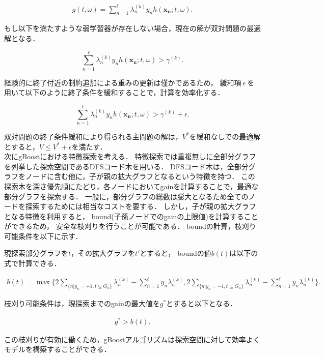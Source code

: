 \begin{align}
	\label{eq:gain}
	g(t, \omega) = \sum_{n=1}^{\ell} \lambda_{n}^{(k)} y_{n} h(\bm{x_{n}} ; t, \omega).
\end{align}

もし以下を満たすような弱学習器が存在しない場合，現在の解が双対問題の最適解となる．

\begin{equation*}
	\sum_{n=1}^{\ell} \lambda_{n}^{(k)} y_{n} h(\bm{x_{n}} ; t, \omega) > \gamma^{(k)}.
\end{equation*}

経験的に終了付近の制約追加による重みの更新は僅かであるため，
緩和項$\ \epsilon \ $を用いて以下のように終了条件を緩和することで，計算を効率化する．

\begin{equation*}
	\sum_{n=1}^{\ell} \lambda_{n}^{(k)} y_{n} h(\bm{x_{n}} ; t, \omega) > \gamma^{(k)} + \epsilon .
\end{equation*}

双対問題の終了条件緩和により得られる主問題の解は，$V^*$を緩和なしでの最適解とすると，$V \leq V^* + \epsilon$を満たす．\\

次にgBoostにおける特徴探索を考える．
特徴探索では重複無しに全部分グラフを列挙した探索空間であるDFSコード木\cite{gSpan}を用いる．
DFSコード木は，全部分グラフをノードに含む他に，子が親の拡大グラフとなるという特徴を持つ．
この探索木を深さ優先順にたどり，各ノードにおいてgainを計算することで，最適な部分グラフを探索する．
一般に，部分グラフの総数は膨大となるため全てのノードを探索するためには相当なコストを要する．
しかし，子が親の拡大グラフとなる特徴を利用すると，
bound(子孫ノードでのgainの上限値)を計算することができるため，
安全な枝刈りを行うことが可能である．
boundの計算，枝刈り可能条件を以下に示す．

現探索部分グラフを$t$，その拡大グラフを$t'$とすると，
boundの値$b(t)$は以下の式で計算できる．

\begin{align}
	\label{eq:bound}
	b(t) = \max\{2 \sum_{\{n|y_{n}=+1, t \subseteq G_{n}\}} \lambda_{n}^{(k)} - \sum_{n=1}^{\ell} y_{n} \lambda_{n}^{(k)},	2 \sum_{\{n|y_{n}=-1, t \subseteq G_{n}\}} \lambda_{n}^{(k)} - \sum_{n=1}^{\ell} y_{n} \lambda_{n}^{(k)}\}.
\end{align}

枝刈り可能条件は，現探索までのgainの最大値を$g^{*}$とすると以下となる．

\begin{align}
	\label{eq:prune}
	g^{*} > b(t).
\end{align}

この枝刈りが有効に働くため，gBoostアルゴリズムは探索空間に対して効率よくモデルを構築することができる．
